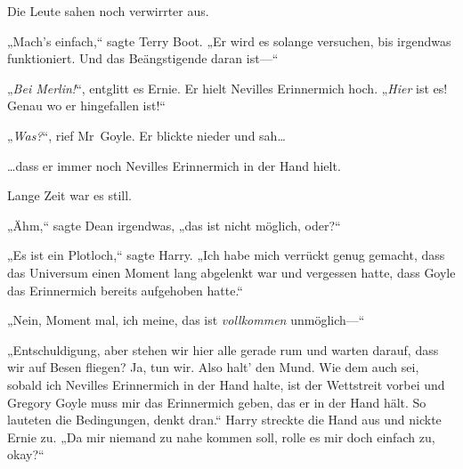 Die Leute sahen noch verwirrter aus.

„Mach’s einfach,“ sagte Terry Boot. „Er wird es solange versuchen, bis irgendwas funktioniert. Und das Beängstigende daran ist—“

„\emph{Bei Merlin!}“, entglitt es Ernie. Er hielt Nevilles Erinnermich hoch. „\emph{Hier} ist es! Genau wo er hingefallen ist!“

„\emph{Was?}“, rief Mr~Goyle. Er blickte nieder und sah…

…dass er immer noch Nevilles Erinnermich in der Hand hielt.

Lange Zeit war es still.

„Ähm,“ sagte Dean irgendwas, „das ist nicht möglich, oder?“

„Es ist ein Plotloch,“ sagte Harry. „Ich habe mich verrückt genug gemacht, dass das Universum einen Moment lang abgelenkt war und vergessen hatte, dass Goyle das Erinnermich bereits aufgehoben hatte.“

„Nein, Moment mal, ich meine, das ist \emph{vollkommen} unmöglich—“

„Entschuldigung, aber stehen wir hier alle gerade rum und warten darauf, dass wir auf Besen fliegen? Ja, tun wir. Also halt’ den Mund. Wie dem auch sei, sobald ich Nevilles Erinnermich in der Hand halte, ist der Wettstreit vorbei und Gregory Goyle muss mir das Erinnermich geben, das er in der Hand hält. So lauteten die Bedingungen, denkt dran.“ Harry streckte die Hand aus und nickte Ernie zu. „Da mir niemand zu nahe kommen soll, rolle es mir doch einfach zu, okay?“

